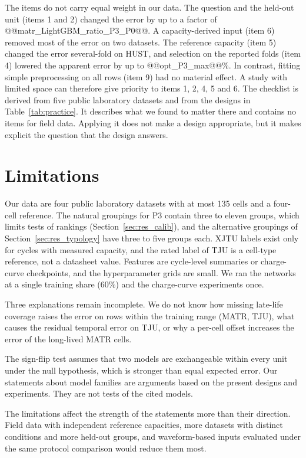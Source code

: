 \documentclass{ieeeaccess}
\begin{document}
The items do not carry equal weight in our data. The question and the held-out unit (items 1 and 2) changed the error by up to a factor of @@matr_LightGBM_ratio_P3_P0@@. A capacity-derived input (item 6) removed most of the error on two datasets. The reference capacity (item 5) changed the error several-fold on HUST, and selection on the reported folds (item 4) lowered the apparent error by up to @@opt_P3_max@@\%. In contrast, fitting simple preprocessing on all rows (item 9) had no material effect. A study with limited space can therefore give priority to items 1, 2, 4, 5 and 6. The checklist is derived from five public laboratory datasets and from the designs in Table~\ref{tab:practice}. It describes what we found to matter there and contains no items for field data. Applying it does not make a design appropriate, but it makes explicit the question that the design answers.

\section{Limitations}
\label{sec:limits}
Our data are four public laboratory datasets with at most 135 cells and a four-cell reference. The natural groupings for P3 contain three to eleven groups, which limits tests of rankings (Section~\ref{sec:res_calib}), and the alternative groupings of Section~\ref{sec:res_typology} have three to five groups each. XJTU labels exist only for cycles with measured capacity, and the rated label of TJU is a cell-type reference, not a datasheet value. Features are cycle-level summaries or charge-curve checkpoints, and the hyperparameter grids are small. We ran the networks at a single training share (60\%) and the charge-curve experiments once.

Three explanations remain incomplete. We do not know how missing late-life coverage raises the error on rows within the training range (MATR, TJU), what causes the residual temporal error on TJU, or why a per-cell offset increases the error of the long-lived MATR cells.

The sign-flip test assumes that two models are exchangeable within every unit under the null hypothesis, which is stronger than equal expected error. Our statements about model families are arguments based on the present designs and experiments. They are not tests of the cited models.

The limitations affect the strength of the statements more than their direction. Field data with independent reference capacities, more datasets with distinct conditions and more held-out groups, and waveform-based inputs evaluated under the same protocol comparison would reduce them most.
\end{document}
